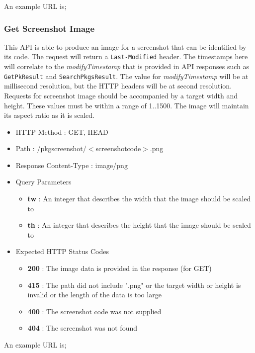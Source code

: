An example URL is;


\subsubsection{Get Screenshot Image}

This API is able to produce an image for a screenshot that can be identified by its code.  The request will return a {\tt Last-Modified} header.  The timestamps here will correlate to the {\it modifyTimestamp} that is provided in API responses such as {\tt GetPkResult} and {\tt SearchPkgsResult}.  The value for {\it modifyTimestamp} will be at millisecond resolution, but the HTTP headers will be at second resolution.  Requests for screenshot image should be accompanied by a target width and height.  These values must be within a range of 1..1500.  The image will maintain its aspect ratio as it is scaled.

\begin{itemize}
\item HTTP Method : GET, HEAD
\item Path : /pkgscreenshot/$<$screenshotcode$>$.png
\item Response Content-Type : image/png
\item Query Parameters
  \begin{itemize}
  \item {\bf tw} : An integer that describes the width that the image should be scaled to
  \item {\bf th} : An integer that describes the height that the image should be scaled to
  \end{itemize}
\item Expected HTTP Status Codes
  \begin{itemize}
  \item {\bf 200} : The image data is provided in the response (for GET)
  \item {\bf 415} : The path did not include ".png" or the target width or height is invalid or the length of the data is too large
  \item {\bf 400} : The screenshot code was not supplied
  \item {\bf 404} : The screenshot was not found
  \end{itemize}
\end{itemize}

An example URL is;

